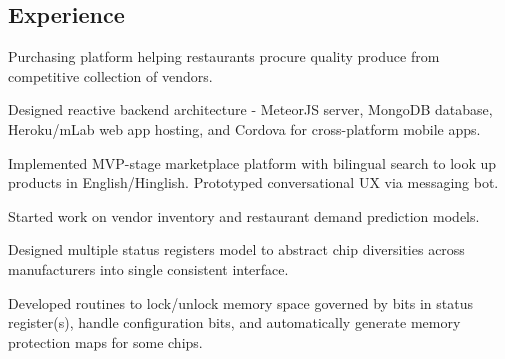 \documentclass[]{deedy}
\begin{document}
\begin{minipage}[t]{0.69\textwidth}
\begin{flushleft}
%
\section{Experience}
%
\vspace{1.1pt}
\begin{tightemize}
\item Purchasing platform helping restaurants procure quality produce from competitive collection of vendors.
\item Designed reactive backend architecture - MeteorJS server, MongoDB database, Heroku/mLab web app hosting, and Cordova for cross-platform mobile apps.
\item Implemented MVP-stage marketplace platform with bilingual search to look up products in English/Hinglish. Prototyped conversational UX via messaging bot.
\item Started work on vendor inventory and restaurant demand prediction models.
\end{tightemize}
\sectionsep
%
\vspace{1.1pt}
\begin{tightemize}
\item Designed multiple status registers model to abstract chip diversities across manufacturers into single consistent interface.
\item Developed routines to lock/unlock memory space governed by bits in status register(s), handle configuration bits, and automatically generate memory protection maps for some chips.

\end{tightemize}
\end{flushleft}
\end{minipage}
\end{document}
